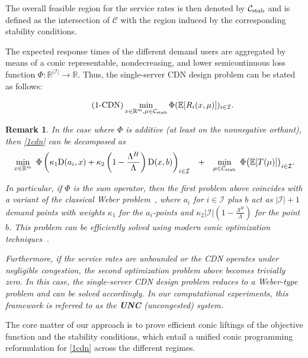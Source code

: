 \documentclass[a4paper,11pt,reqno]{amsart}
\newtheorem{remark}{Remark}
\newcommand{\R}{\mathbb{R}}
\newcommand{\E}{\mathbb{E}}
\newcommand{\I}{\mathcal{I}}
\newcommand{\D}{\mathrm{D}}
\begin{document}
The overall feasible region for the service rates is then denoted by $\mathcal{C}_{\rm stab}$ and is defined as the intersection of $\mathcal{C}$ with the region induced by the corresponding stability conditions.

The expected response times of the different demand users are aggregated by means of a conic representable, nondecreasing, and lower semicontinuous loss function $\Phi:\R^{|\I|}\to \R$. Thus, the single-server CDN design problem can be stated as follows:

\begin{equation}\label{1cdn}\tag{1-CDN}
    \min_{x\in\R^m, \mu\in \mathcal{C}_{\rm stab}} \Phi(\E[R_i(x,\mu)])_{i\in\I}.
\end{equation}

\begin{remark}
In the case where $\Phi$ is additive (at least on the nonnegative orthant), then \eqref{1cdn} can be decomposed as
\begin{equation*}
\begin{array}{ccc}
\displaystyle\min_{x\in\R^m} \ \Phi\left(\kappa_1 \D(a_i,x) + \kappa_2 \left(1-\frac{\Lambda^H}{\Lambda}\right) \D(x,b)\right)_{i\in\I}
& + &
\displaystyle\min_{\mu\in \mathcal{C}_{\rm stab}} \ \Phi\big(\E[T(\mu)]\big)_{i\in\I}.
\end{array}
\end{equation*}

In particular, if $\Phi$ is the sum operator, then the first problem above coincides with a variant of the classical Weber problem~\citep{weiszfeld1937point}, where $a_i$ for $i\in\I$ plus $b$ act as $|\I|+1$ demand points with weights $\kappa_1$ for the $a_i$-points and $\kappa_2|\I|\left(1-\frac{\Lambda^H}{\Lambda}\right)$ for the point $b$. This problem can be efficiently solved using modern conic optimization techniques~\citep{blanco2014revisiting}.

Furthermore, if the service rates are unbounded or the {\rm CDN} operates under negligible congestion, the second optimization problem above becomes trivially zero. In this case, the single-server {\rm CDN} design problem reduces to a Weber-type problem and can be solved accordingly. In our computational experiments, this framework is referred to as the {\rm \bf UNC} (uncongested) system.
\end{remark}

The core matter of our approach is to prove efficient conic liftings of the objective function and the stability conditions, which entail a unified conic programming reformulation for \eqref{1cdn} across the different regimes.\\
\end{document}
